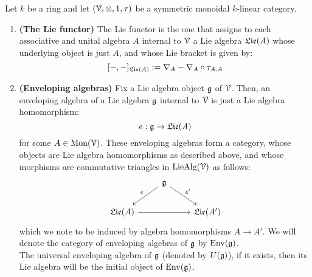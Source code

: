     \begin{definition} \label{def: enveloping_algebras}
        Let $k$ be a ring and let $(\calV, \tensor, 1, \tau)$ be a symmetric monoidal $k$-linear category.
            \begin{enumerate}
                \item \textbf{(The Lie functor)} The Lie functor is the one that assigns to each associative and unital algebra $A$ internal to $\mathcal{V}$ a Lie algebra $\mathfrak{Lie}(A)$ whose underlying object is just $A$, and whose Lie bracket is given by:
                    $$[-,-]_{\mathfrak{Lie}(A)} := \nabla_A - \nabla_A \circ \tau_{A,A}$$
                \item \textbf{(Enveloping algebras)} Fix a Lie algebra object $\mathfrak{g}$ of $\mathcal{V}$. Then, an enveloping algebra of a Lie algebra $\mathfrak{g}$ internal to $\mathcal{V}$ is just a Lie algebra homomorphism:
                    $$e: \mathfrak{g} \to \mathfrak{Lie}(A)$$
                for some $A \in \mathrm{Mon}(\mathcal{V})$. These enveloping algebras form a category, whose objects are Lie algebra homomorphisms as described above, and whose morphisms are commutative triangles in $\mathrm{Lie}\mathrm{Alg}(\mathcal{V})$ as follows:
                    $$
                        \begin{tikzcd}
                        	& {\g} \\
                        	{\frakLie(A)} && {\frakLie(A')}
                        	\arrow[from=2-1, to=2-3]
                        	\arrow["{e}"', from=1-2, to=2-1]
                        	\arrow["{e'}", from=1-2, to=2-3]
                        \end{tikzcd}
                    $$
                which we note to be induced by algebra homomorphisms $A \to A'$. We will denote the category of enveloping algebras of $\mathfrak{g}$ by $\mathrm{Env}(\mathfrak{g})$. 
                \\
                The universal enveloping algebra of $\mathfrak{g}$ (denoted by $U(\mathfrak{g})$), if it exists, then its Lie algebra will be the initial object of $\mathrm{Env}(\mathfrak{g})$. 
            \end{enumerate}
    \end{definition}
    
